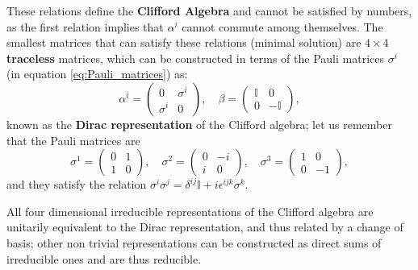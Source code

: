 These relations define the \textbf{Clifford Algebra} and cannot be satisfied by numbers, as the first relation implies that \(\alpha^i\) cannot commute among themselves. The smallest matrices that can satisfy these relations (minimal solution) are \(4 \times 4\) \textbf{traceless} matrices, which can be constructed in terms of the Pauli matrices \(\sigma^i\) (in equation \eqref{eq:Pauli_matrices}) as:
\begin{equation}
    \alpha^i = \begin{pmatrix}
        0        & \sigma^i \\
        \sigma^i & 0
    \end{pmatrix}, \quad \beta = \begin{pmatrix}
        \mathbb{I} & 0           \\
        0          & -\mathbb{I}
    \end{pmatrix},
    \label{eq:dirac_representation}
\end{equation}
known as the \textbf{Dirac representation} of the Clifford algebra; let us remember that the Pauli matrices are
\[
    \sigma^1 = \begin{pmatrix}
        0 & 1 \\
        1 & 0
    \end{pmatrix}, \quad
    \sigma^2 = \begin{pmatrix}
        0 & -i \\
        i & 0
    \end{pmatrix}, \quad
    \sigma^3 = \begin{pmatrix}
        1 & 0  \\
        0 & -1
    \end{pmatrix},
\]
and they satisfy the relation \(\sigma^i \sigma^j = \delta^{ij} \mathbb{I} + i \epsilon^{ijk} \sigma^k\).

\begin{theorem}
    All four dimensional irreducible representations of the Clifford algebra are unitarily equivalent to the Dirac representation, and thus related by a change of basis; other non trivial representations can be constructed as direct sums of irreducible ones and are thus reducible.
\end{theorem}


